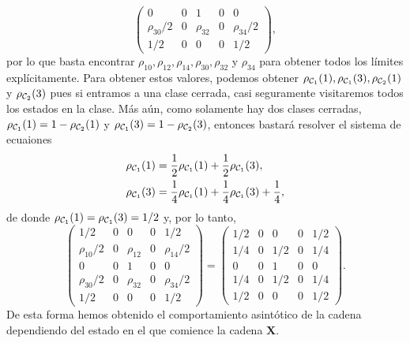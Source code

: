 \begin{example}
\[\begin{pmatrix}
            0 & 0 & 1 & 0 & 0 \\
            \rho_{30}/2 & 0 & \rho_{32} & 0 & \rho_{34}/2 \\
            1/2 & 0 & 0 & 0 & 1/2
        \end{pmatrix},
    \] por lo que basta encontrar $\rho_{10}, \rho_{12}, \rho_{14}, \rho_{30}, \rho_{32}$ y $\rho_{34}$ para obtener todos los límites explícitamente. Para obtener estos valores, podemos obtener  $\rho_{\mathcal{C}_1}(1), \rho_{\mathcal{C}_1}(3), \rho_{\mathcal{C}_2}(1)$ y $\rho_{\mathcal{C}_2}(3)$ pues si entramos a una clase cerrada, casi seguramente visitaremos todos los estados en la clase. Más aún, como solamente hay dos clases cerradas, $\rho_{\mathcal{C}_1}(1) = 1 - \rho_{\mathcal{C}_2}(1)$ y $\rho_{\mathcal{C}_1}(3) = 1 - \rho_{\mathcal{C}_2}(3)$, entonces bastará resolver el sistema de ecuaiones 
    \begin{align*}
        \rho_{\mathcal{C}_1}(1) & = \frac 1 2 \rho_{\mathcal{C}_1}(1) + \frac 1 2 \rho_{\mathcal{C}_1}(3), \\
        \rho_{\mathcal{C}_1}(3) & = \frac 1 4 \rho_{\mathcal{C}_1}(1) + \frac 1 4 \rho_{\mathcal{C}_1}(3) + \frac 1 4,
    \end{align*}
    de donde $\rho_{\mathcal{C}_1}(1) = \rho_{\mathcal{C}_1}(3) = 1/2$ y, por lo tanto,
    \[
        \begin{pmatrix}
            1/2 & 0 & 0 & 0 & 1/2 \\
            \rho_{10}/2 & 0 & \rho_{12} & 0 & \rho_{14}/2 \\
            0 & 0 & 1 & 0 & 0 \\
            \rho_{30}/2 & 0 & \rho_{32} & 0 & \rho_{34}/2 \\
            1/2 & 0 & 0 & 0 & 1/2
        \end{pmatrix} = 
        \begin{pmatrix}
            1/2 & 0 & 0 & 0 & 1/2 \\
            1/4 & 0 & 1/2 & 0 & 1/4 \\
            0 & 0 & 1 & 0 & 0 \\
            1/4 & 0 & 1/2 & 0 & 1/4 \\
            1/2 & 0 & 0 & 0 & 1/2
        \end{pmatrix}.
    \]
    De esta forma hemos obtenido el comportamiento asintótico de la cadena dependiendo del estado en el que comience la cadena $\bm X$.
\end{example}


